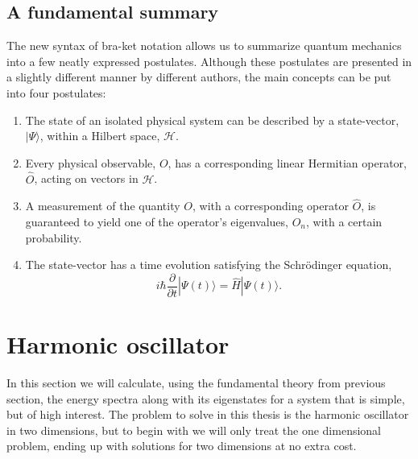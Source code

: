 \subsection{A fundamental summary}
The new syntax of bra-ket notation allows us to summarize quantum mechanics into a
few neatly expressed postulates. 
Although these postulates are presented in a slightly different manner by
different authors, the main concepts can be put into four postulates:
\begin{enumerate}[{Postulate} 1: ]
\item The state of an isolated physical system can be described by a
state-vector, $|\Psi \rangle$,  within
a Hilbert space, $\mathcal{H}$.
\item Every physical observable, $O$, has a corresponding linear Hermitian
operator, $\hat{O}$, acting on vectors in $\mathcal{H}$.
\item A measurement of the quantity $O$, with a corresponding operator
$\hat{O}$, is guaranteed to yield one of the operator's eigenvalues, $O_n$, with a
certain probability.
\item The state-vector has a time evolution satisfying the Schrödinger
equation,
\begin{equation}
\label{eq:qm:schrodingerbraket}
i\hbar \frac{\partial}{\partial t} | \Psi(t) \rangle =
\hat{H} | \Psi(t) \rangle .
\end{equation}
\end{enumerate}



\section{Harmonic oscillator}
\label{sec:qm:ho}
In this section we will calculate, using the fundamental theory from previous section, the energy spectra along with its eigenstates for a system that is simple, but of high interest.
The problem to solve in this thesis is the harmonic oscillator in two dimensions, but
to begin with we will only treat the one dimensional problem, ending up with
solutions for two dimensions at no extra cost.


